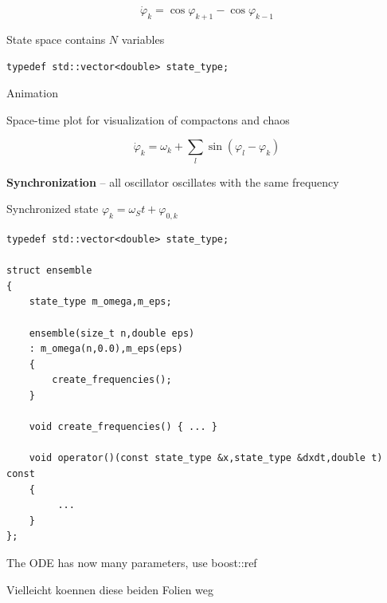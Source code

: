 \begin{frame}[fragile]
 

 \vspace{2ex}

 $$\dot{\varphi}_k = \cos \varphi_{k+1} - \cos \varphi_{k-1}$$

 \vspace{2ex}

 State space contains $N$ variables

 \begin{lstlisting}
typedef std::vector<double> state_type;
 \end{lstlisting}

 Animation

 Space-time plot for visualization of compactons and chaos

\end{frame}





\begin{frame}[fragile]


 \vspace{2ex}

$$\dot{\varphi}_k = \omega_k + \sum\limits_l \sin( \varphi_l - \varphi_k )$$

{\bf Synchronization} -- all oscillator oscillates with the same frequency

 \vspace{2ex}

Synchronized state $\varphi_k = \omega_S t + \varphi_{0,k} $

\end{frame}



\begin{frame}[fragile]


\begin{lstlisting}
typedef std::vector<double> state_type;

struct ensemble
{
    state_type m_omega,m_eps;

    ensemble(size_t n,double eps)
    : m_omega(n,0.0),m_eps(eps)
    {
        create_frequencies();
    }

    void create_frequencies() { ... }

    void operator()(const state_type &x,state_type &dxdt,double t) const
    {
         ...
    }
};
\end{lstlisting}

The ODE has now many parameters, use boost::ref

Vielleicht koennen diese beiden Folien weg

\end{frame}



